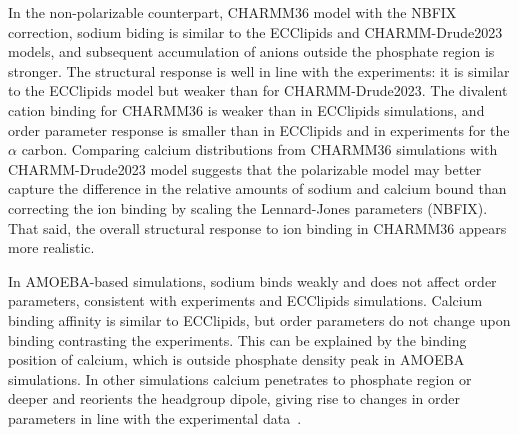 \documentclass[journal=jctcce,manuscript=article,layout=singlecolumn]{achemso}
\begin{document}
In the non-polarizable counterpart, CHARMM36 model with the NBFIX correction, sodium biding is similar to the ECClipids and CHARMM-Drude2023 models, and subsequent accumulation of anions outside the phosphate region is stronger. The structural response is well in line with the experiments: it is similar to the ECClipids model but weaker than for CHARMM-Drude2023. The divalent cation binding for CHARMM36 is weaker than in ECClipids simulations, and order parameter response is smaller than in ECClipids and in experiments for the $\alpha$ carbon. Comparing calcium distributions from CHARMM36 simulations with CHARMM-Drude2023 model suggests that the polarizable model may better capture the difference in the relative amounts of sodium and calcium bound than correcting the ion binding by scaling the Lennard-Jones parameters (NBFIX). That said, the overall structural response to ion binding in CHARMM36 appears more realistic.
%

In AMOEBA-based simulations, sodium binds weakly and does not affect order parameters, consistent with experiments and ECClipids simulations. Calcium binding affinity is similar to ECClipids, but order parameters do not change upon binding contrasting the experiments. This can be explained by the binding position of calcium, which is outside phosphate density peak in AMOEBA simulations. In other simulations calcium penetrates to phosphate region or deeper and reorients the headgroup dipole, giving rise to changes in order parameters in line with the experimental data~\cite{Catte2016}. 
\end{document}
